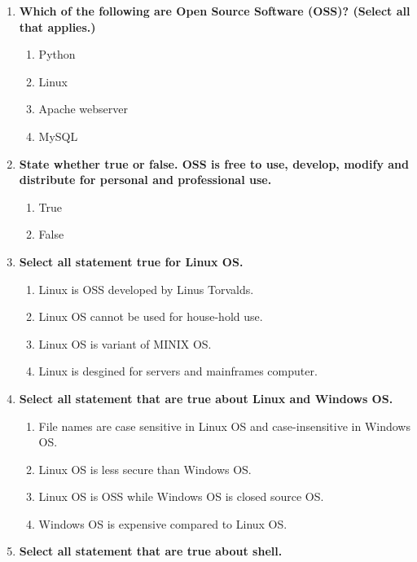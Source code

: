 \begin{flushleft}
	\begin{enumerate}
		\item \textbf{Which of the following are Open Source Software (OSS)? (Select all that applies.)}
		\begin{enumerate}[label=(\alph*)]
			\item Python %
			\item Linux %
			\item Apache webserver %
			\item MySQL %
		\end{enumerate}
		\bigskip
		\bigskip
		\item \textbf{State whether true or false. OSS is free to use, develop, modify and distribute for personal and professional use.}
		\begin{enumerate}[label=(\alph*)]
			\item True  %
			\item False
		\end{enumerate}
		\bigskip
		\bigskip
		\item \textbf{Select all statement true for Linux OS.}
		\begin{enumerate}[label=(\alph*)] 
			\item Linux is OSS developed by Linus Torvalds. %
			\item Linux OS cannot be used for house-hold use.
			\item Linux OS is variant of MINIX OS.    %
			\item Linux is desgined for servers and mainframes computer.   %
		\end{enumerate}
		\bigskip
		\bigskip
		\newpage
		\item \textbf{Select all statement that are true about Linux and Windows OS.}
		\begin{enumerate}[label=(\alph*)]
			\item File names are case sensitive in Linux OS and case-insensitive in Windows OS.  %
			\item Linux OS is less secure than Windows OS.   
			\item Linux OS is OSS while Windows OS is closed source OS.   %
			\item Windows OS is expensive compared to Linux OS.   %
		\end{enumerate}
		\bigskip
		\bigskip
		\item \textbf{Select all statement that are true about shell.}
		\begin{enumerate}[label=(\alph*)]

\end{enumerate}
\end{enumerate}
\end{flushleft}
